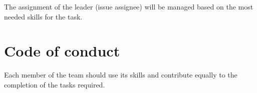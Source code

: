 \documentclass{article}
\begin{document}
The assignment of the leader (issue assignee) will be managed based on the most needed skills for the task.

\section{Code of conduct}

Each member of the team should use its skills and contribute equally to the completion of the tasks required.



%
\end{document}
